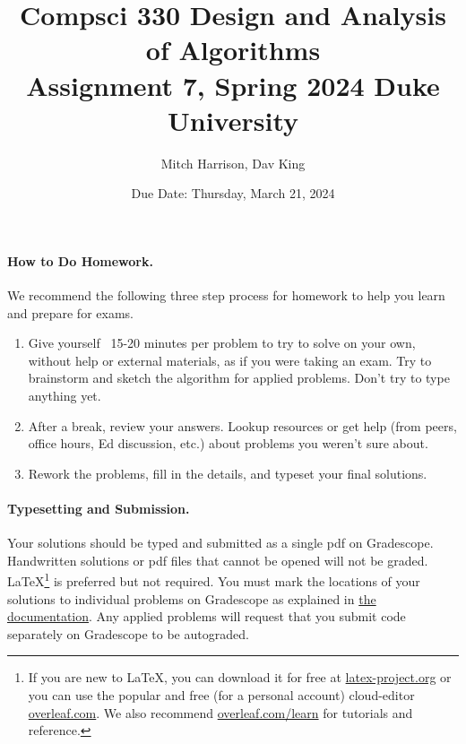 \documentclass[11pt]{article}
\title{\vspace{-0.5in}Compsci 330 Design and Analysis of Algorithms \\Assignment 7, Spring 2024 Duke University}
\author{Mitch Harrison, Dav King}
\date{Due Date: Thursday, March 21, 2024}
\begin{document}
\maketitle



\paragraph{How to Do Homework.} We recommend the following three step process for homework to help you learn and prepare for exams.
\begin{enumerate}
	\item Give yourself ~15-20 minutes per problem to try to solve on your own, without help or external materials, as if you were taking an exam. Try to brainstorm and sketch the algorithm for applied problems. Don't try to type anything yet.
	\item After a break, review your answers. Lookup resources or get help (from peers, office hours, Ed discussion, etc.) about problems you weren't sure about.
	\item Rework the problems, fill in the details, and typeset your final solutions.
\end{enumerate}

\paragraph{Typesetting and Submission.} Your solutions should be typed and submitted as a single pdf on Gradescope. Handwritten solutions or pdf files that cannot be opened will not be graded. \LaTeX \footnote{If you are new to \LaTeX, you can download it for free at \href{https://www.latex-project.org}{latex-project.org} or you can use the popular and free (for a personal account) cloud-editor \href{https://www.overleaf.com}{overleaf.com}. We also recommend \href{https://www.overleaf.com/learn}{overleaf.com/learn} for tutorials and reference.} is preferred but not required. %
You must mark the locations of your solutions to individual problems on Gradescope as explained in \href{https://help.gradescope.com/article/ccbpppziu9-student-submit-work#submitting_a_pdf}{the documentation}. Any applied problems will request that you submit code separately on Gradescope to be autograded. 
\end{document}

